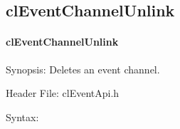 \begin{flushleft}
\subsection{clEventChannelUnlink}
\hypertarget{pageem106}{}\paragraph{cl\-Event\-Channel\-Unlink}\label{pageem106}
\begin{Desc}
\item[Synopsis:]Deletes an event channel.\end{Desc}
\begin{Desc}
\item[Header File:]clEventApi.h\end{Desc}
\begin{Desc}
\item[Syntax:]


\end{Desc}
\end{flushleft}
